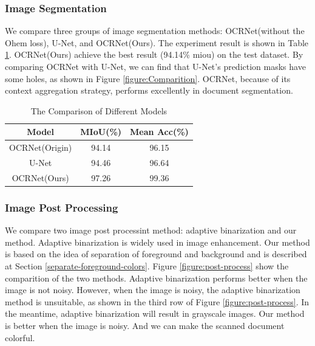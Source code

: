 \documentclass[10pt, conference, compsocconf]{IEEEtran}
\begin{document}
\subsubsection{Image Segmentation}

We compare three groups of image segmentation methods: OCRNet(without the Ohem loss), U-Net, and OCRNet(Ours). 
The experiment result is shown in Table \ref{table:comparition}.
OCRNet(Ours) achieve the best result (94.14\% miou) on the test dataset.
By comparing OCRNet with U-Net, we can find that U-Net's prediction masks have some holes, as shown in Figure \ref{figure:Comparition}. 
OCRNet, because of its context aggregation strategy, performs excellently in document segmentation.

\begin{table}[!h]
	\caption{The Comparison of Different Models}
	\centering
	\label{table:comparition}
	\begin{tabular}{ccc} \\
	\hline
	Model & MIoU(\%) & Mean Acc(\%)\\
	\hline
	OCRNet(Origin) & 94.14 & 96.15\\
	U-Net & 94.46 & 96.64\\
	OCRNet(Ours) & 97.26 & 99.36\\
	\hline
	\end{tabular}
\end{table}

\subsubsection{Image Post Processing}
We compare two image post processint method: adaptive binarization and our method. 
Adaptive binarization is widely used in image enhancement. 
Our method is based on the idea of separation of foreground and background and is described at Section \ref{separate-foreground-colors}.
Figure \ref{figure:post-process} show the comparition of the two methods.
Adaptive binarization performs better when the image is not noisy.
However, when the image is noisy, the adaptive binarization method is unsuitable, as shown in the third row of Figure \ref{figure:post-process}.
In the meantime, adaptive binarization will result in grayscale images.
Our method is better when the image is noisy. 
And we can make the scanned document colorful.
\end{document}
